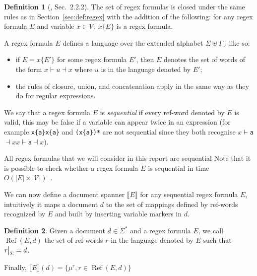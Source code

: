 \documentclass[12px]{article}
\theoremstyle{definition}
\newtheorem{definition}{Definition}
\DeclareMathOperator{\Ref}{Ref}
\newcommand\restr[2]{{%
  \left.\kern-\nulldelimiterspace %
  #1 %
  \vphantom{\big|} %
  \right|_{#2} %
  }}
\begin{document}
        \begin{definition}[\cite{peterfreund}, Sec.\ 2.2.2]
          The set of regex formulas is closed under the same rules as in
          Section~\ref{sec:def:regex} with the addition of the following: for
          any regex formula $E$ and variable $x \in \mathcal{V}$, $x\{E\}$ is a
          regex formula.

          A regex formula $E$ defines a language over the extended alphabet
          $\Sigma \uplus \Gamma_\mathcal{V}$ like so:
            \begin{itemize}
              \item if $E = x\{E'\}$ for some regex formula $E'$, then $E$ denotes
                the set of words of the form $x{\vdash} u {\dashv}x$ where $u$ is
                in the language denoted by $E'$;
              \item the rules of closure, union, and concatenation apply in the same
                way as they do for regular expressions.
            \end{itemize}

          We say that a regex formula $E$ is \textit{sequential} if every
          ref-word denoted by $E$ is valid, this may be false if a variable can
          appear twice in an expression (for example \texttt{x\{a\}x\{a\}} and
          \texttt{(x\{a\})*} are not sequential since they both recognise
          \texttt{$x{\vdash}$a${\dashv}x$$x{\vdash}$a${\dashv}x$}).
        \end{definition}

        All regex formulas that we will consider in this report are sequential
        Note that it is possible to check whether a regex formula $E$ is
        sequential in time $O(|E| \times |\mathcal{V}|)$~\cite{peterfreund}.

        We can now define a document spanner $\llbracket E \rrbracket$ for any
        sequential regex formula $E$, intuitively it maps a document $d$ to the
        set of mappings defined by ref-words recognized by $E$ and built by
        inserting variable markers in $d$.

        \begin{definition}
          Given a document $d \in \Sigma^*$ and a regex formula $E$, we call
          $\Ref(E, d)$ the set of ref-words $r$ in the language denoted by $E$
          such that $\restr{r}{\Sigma} = d$.

          Finally, $\llbracket E \rrbracket (d) = \{\mu^r, r \in \Ref(E, d)\}$
        \end{definition}
\end{document}
